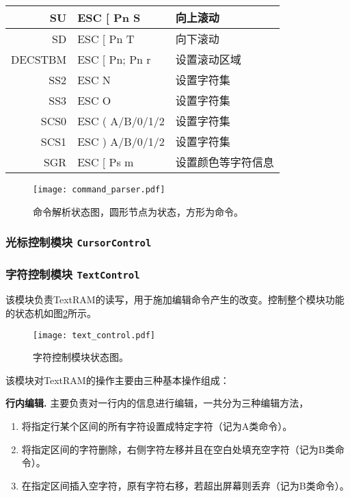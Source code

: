 \begin{longtable}{|r|l|l|}
SU & ESC [ Pn S &向上滚动 \\ \hline
SD & ESC [ Pn T &向下滚动 \\ \hline
DECSTBM & ESC [ Pn; Pn r &设置滚动区域 \\ \hline \hline

SS2 & ESC N&设置字符集 \\ \hline
SS3 & ESC O&设置字符集 \\ \hline
SCS0 & ESC ( A/B/0/1/2 & 设置字符集 \\ \hline
SCS1 & ESC ) A/B/0/1/2 &设置字符集 \\ \hline \hline

SGR & ESC [ Ps m &设置颜色等字符信息 \\ \hline
\end{longtable}
\begin{figure}[htbp]
\centerline{
\texttt{[image: command\_parser.pdf]}
}
\label{fig:command_parser}
\caption{命令解析状态图，圆形节点为状态，方形为命令。}
\end{figure}

\subsubsection{光标控制模块 \texttt{CursorControl}}
\subsubsection{字符控制模块 \texttt{TextControl}}
该模块负责TextRAM的读写，用于施加编辑命令产生的改变。控制整个模块功能的状态机如图\ref{fig:text_control}所示。

\begin{figure}[htbp]
\centerline{
\texttt{[image: text\_control.pdf]}
}
\label{fig:text_control}
\caption{字符控制模块状态图。}
\end{figure}

该模块对TextRAM的操作主要由三种基本操作组成：

\textbf{行内编辑. }主要负责对一行内的信息进行编辑，一共分为三种编辑方法，
\begin{enumerate}
	\item 将指定行某个区间的所有字符设置成特定字符（记为A类命令）。
	\item 将指定区间的字符删除，右侧字符左移并且在空白处填充空字符（记为B类命令）。
	\item 在指定区间插入空字符，原有字符右移，若超出屏幕则丢弃（记为B类命令）。
\end{enumerate}

